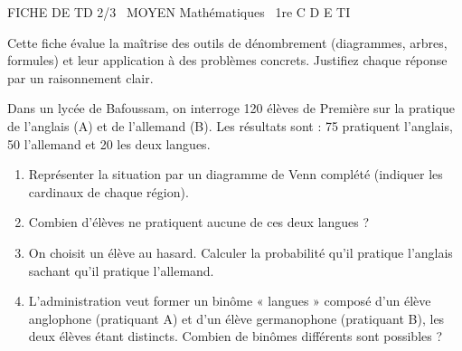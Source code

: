 \documentclass[11pt]{article}
\begin{document}
\begin{tcolorbox}[enhanced,colback=popink,colframe=popink,arc=10pt,boxrule=0pt,left=12pt,right=12pt,top=9pt,bottom=9pt]
{\color{white}\popxbold\small FICHE DE TD 2/3 \textbullet\ MOYEN \hfill Mathématiques \textbullet\ 1re C D E TI\par}
\end{tcolorbox}
\vspace{4pt}
\noindent Cette fiche évalue la maîtrise des outils de dénombrement (diagrammes, arbres, formules) et leur application à des problèmes concrets. Justifiez chaque réponse par un raisonnement clair.

\begin{exercice}
Dans un lycée de Bafoussam, on interroge \num{120} élèves de Première sur la pratique de l'anglais (A) et de l'allemand (B). Les résultats sont : \num{75} pratiquent l'anglais, \num{50} l'allemand et \num{20} les deux langues.
\begin{enumerate}
    \item Représenter la situation par un diagramme de Venn complété (indiquer les cardinaux de chaque région).
    \item Combien d'élèves ne pratiquent aucune de ces deux langues ?
    \item On choisit un élève au hasard. Calculer la probabilité qu'il pratique l'anglais sachant qu'il pratique l'allemand.
    \item L'administration veut former un binôme « langues » composé d'un élève anglophone (pratiquant A) et d'un élève germanophone (pratiquant B), les deux élèves étant distincts. Combien de binômes différents sont possibles ?
\end{enumerate}
\end{exercice}
\end{document}
